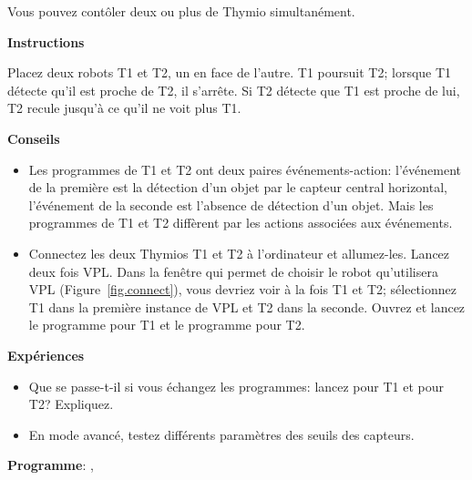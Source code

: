 \label{ch.two}

Vous pouvez contôler deux ou plus de Thymio simultanément.

\textbf{Instructions}

Placez deux robots T1 et T2, un en face de l'autre. T1 poursuit T2;
lorsque T1 détecte qu'il est proche de T2, il s'arrête.
Si T2 détecte que T1 est proche de lui, T2 recule jusqu'à ce qu'il ne voit plus T1.

\textbf{Conseils}

\begin{itemize}

\item Les programmes de T1 et T2 ont deux paires événements-action: l'événement de la première
est la détection d'un objet par le capteur central horizontal,
l'événement de la seconde est l'absence de détection d'un objet.
Mais les programmes de T1 et T2 diffèrent par les actions associées aux événements.

\item Connectez les deux Thymios T1 et T2 à l'ordinateur et allumez-les.
Lancez deux fois VPL. Dans la fenêtre qui permet de choisir le robot qu'utilisera VPL
(Figure~\ref{fig.connect}), vous devriez voir à la fois T1 et T2;
sélectionnez T1 dans la première instance de VPL et T2 dans la seconde.
Ouvrez et lancez le programme  pour T1 et le programme  pour T2.

\end{itemize}

\textbf{Expériences}

\begin{itemize}

\item Que se passe-t-il si vous échangez les programmes: lancez  pour T1 et  pour T2? Expliquez.

\item En mode avancé, testez différents paramètres des seuils des capteurs.

\end{itemize}

{\raggedleft \hfill \textbf{Programme}: , }

\bigskip


